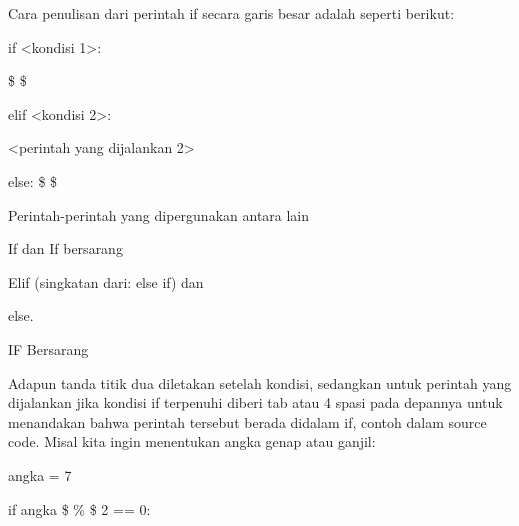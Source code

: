 \noindent 
\vspace{\baselineskip}
Cara penulisan dari perintah if secara garis besar adalah seperti berikut: \par
\noindent 
\vspace{\baselineskip}
\vspace{\baselineskip}
if <kondisi 1>: \par
\noindent 
\vspace{\baselineskip}
 \$  \$<perintah yang dijalankan 1> \par
\noindent 
\vspace{\baselineskip}
elif <kondisi 2>: \par
\noindent 
\vspace{\baselineskip}
<perintah yang dijalankan 2> \par
\noindent 
\vspace{\baselineskip}
else:\vspace{\baselineskip}
 \$  \$<perintah yang dijalankan 3> \par
\noindent 
\vspace{\baselineskip}
\vspace{\baselineskip}
Perintah-perintah yang dipergunakan antara lain \par
\noindent 
\vspace{\baselineskip}
If dan If bersarang \par
\noindent 
\vspace{\baselineskip}
Elif (singkatan dari: else if) dan \par
\noindent 
\vspace{\baselineskip}
else.\vspace{\baselineskip}
 \par
\noindent 
\vspace{\baselineskip}
IF Bersarang \par
\noindent 
\vspace{\baselineskip}
Adapun tanda titik dua diletakan setelah kondisi, sedangkan untuk perintah yang dijalankan jika kondisi if terpenuhi diberi tab atau 4 spasi pada depannya untuk menandakan bahwa perintah tersebut berada didalam if, contoh dalam source code. Misal kita ingin menentukan angka genap atau ganjil: \par
\noindent 
\vspace{\baselineskip}
angka = 7 \par
\noindent 
\vspace{\baselineskip}
if angka  \$  \%  \$ 2 == 0: \par
\noindent 
\vspace{\baselineskip}
